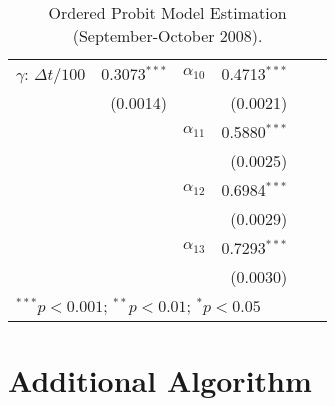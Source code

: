 \begin{table}[H]
\begin{center}
{\begin{tabular}{lrlrlr}
$\gamma$: \(\Delta t/100\) & 0.3073$^{***}$ & $\alpha_{10}$ & 0.4713$^{***}$ & & \\
 & (0.0014) & & (0.0021) & & \\
 
 & & $\alpha_{11}$ & 0.5880$^{***}$ & & \\
 & & & (0.0025) & & \\
 
 & & $\alpha_{12}$ & 0.6984$^{***}$ & & \\
 & & & (0.0029) & & \\
 
 & & $\alpha_{13}$ & 0.7293$^{***}$ & & \\
 & & & (0.0030) & & \\
\bottomrule
\multicolumn{6}{l}{\scriptsize{$^{***}p<0.001$; $^{**}p<0.01$; $^{*}p<0.05$}}
\end{tabular}
}
\caption{Ordered Probit Model Estimation (September-October 2008).}
\label{tab:table-26}
\end{center}
\end{table}





\chapter{Additional Algorithm}


